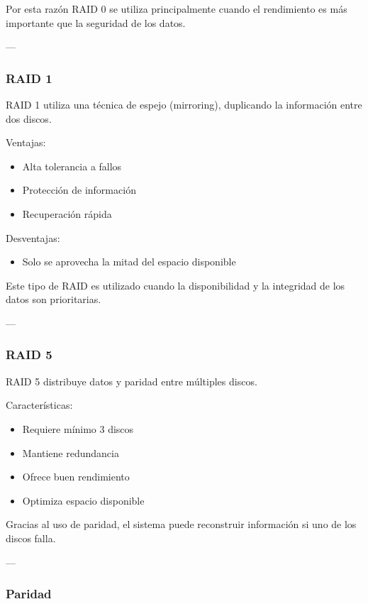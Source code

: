 \documentclass[11pt, letterpaper]{article}
\begin{document}
Por esta razón RAID 0 se utiliza principalmente cuando el rendimiento es más importante que la seguridad de los datos.

---
\subsubsection{RAID 1}
\label{sec:org0d6311b}

RAID 1 utiliza una técnica de espejo (mirroring), duplicando la información entre dos discos.

Ventajas:

\begin{itemize}
\item Alta tolerancia a fallos
\item Protección de información
\item Recuperación rápida
\end{itemize}

Desventajas:

\begin{itemize}
\item Solo se aprovecha la mitad del espacio disponible
\end{itemize}

Este tipo de RAID es utilizado cuando la disponibilidad y la integridad de los datos son prioritarias.

---
\subsubsection{RAID 5}
\label{sec:org35d4cc4}

RAID 5 distribuye datos y paridad entre múltiples discos.

Características:

\begin{itemize}
\item Requiere mínimo 3 discos
\item Mantiene redundancia
\item Ofrece buen rendimiento
\item Optimiza espacio disponible
\end{itemize}

Gracias al uso de paridad, el sistema puede reconstruir información si uno de los discos falla.

---
\subsubsection{Paridad}
\label{sec:org1d97edb}
\end{document}
